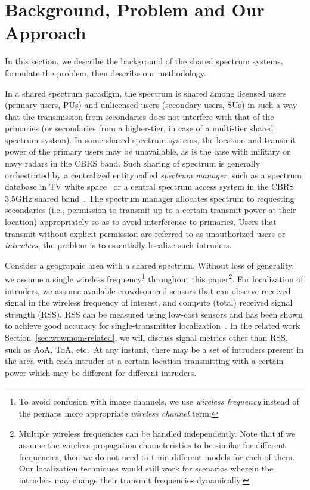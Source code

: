 \section{\bf Background, \mtl Problem and Our Approach}
\label{sec:problem}
\label{sec:prob-def}

In this section, we describe the background of the shared spectrum systems,
formulate the \mtl problem, then describe our methodology. 

 In a shared spectrum paradigm, the
spectrum is shared among licensed users (primary users, PUs) and
unlicensed users (secondary users, SUs) in such a way that the
transmission from secondaries does not interfere with that of the
primaries (or secondaries from a higher-tier, in case of a multi-tier
shared spectrum system). In some shared spectrum systems,
the location and transmit power of the primary users may be
unavailable, as is the case with military or navy radars in the CBRS band.
Such sharing of spectrum is generally orchestrated by a centralized
entity called {\em spectrum manager}, such as a spectrum
database in TV white
space~\cite{sas-paper} or a central spectrum access system in
the CBRS 3.5GHz shared band~\cite{milind2015dyspan}. The spectrum
manager allocates spectrum to requesting secondaries (i.e., permission
to transmit up to a certain transmit power at their location) appropriately
so as to avoid interference to primaries.
Users that transmit without explicit permission are referred to as 
unauthorized users or {\em intruders}; the \mtl problem is to essentially
localize such intruders. 

  Consider a geographic
area with a shared spectrum. Without loss of generality, we assume a
single wireless frequency\footnote{To avoid confusion with image channels, we use {\em wireless frequency} instead of the perhaps more appropriate {\em wireless channel} term.} throughout this paper\footnote{Multiple wireless frequencies can be handled independently. 
Note that if we assume the wireless propagation characteristics to be similar for different frequencies, then we do not need to train different models for each of them. Our localization techniques would still work
for scenarios wherein the intruders may change their transmit frequencies dynamically.}.
For localization of intruders, we assume
available crowdsourced sensors that can observe received signal in the wireless frequency of interest, and compute (total) received signal strength (RSS).
RSS can be measured using low-cost sensors and has been shown to achieve good accuracy for single-transmitter localization~\cite{infocom00-radar}.
In the related work Section~\ref{sec:wowmom-related}, we will discuss signal metrics other than RSS, such as AoA, ToA, etc.~At any instant, there may be a set of intruders
present in the area with each intruder at a certain location transmitting
with a certain power which may be different for different intruders.

